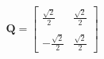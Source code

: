 \documentclass[preview]{standalone}
\begin{document}
\begin{align*}
\mathbf{Q} = \begin{bmatrix} \frac{\sqrt{2}}{2} & \frac{\sqrt{2}}{2} \\ \\-\frac{\sqrt{2}}{2} &  \frac{\sqrt{2}}{2} \end{bmatrix}
\end{align*}
\end{document}
